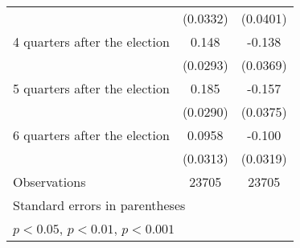 \begin{table}[htbp]
\begin{tabular}{l*{2}{c}}
                    &    (0.0332)         &    (0.0401)         \\
[1em]
 4 quarters after the election&       0.148\sym{***}&      -0.138\sym{***}\\
                    &    (0.0293)         &    (0.0369)         \\
[1em]
 5 quarters after the election&       0.185\sym{***}&      -0.157\sym{***}\\
                    &    (0.0290)         &    (0.0375)         \\
[1em]
 6 quarters after the election&      0.0958\sym{**} &      -0.100\sym{**} \\
                    &    (0.0313)         &    (0.0319)         \\
\hline
Observations        &       23705         &       23705         \\
\hline\hline
\multicolumn{3}{l}{\footnotesize Standard errors in parentheses}\\
\multicolumn{3}{l}{\footnotesize \sym{*} \(p<0.05\), \sym{**} \(p<0.01\), \sym{***} \(p<0.001\)}\\
\end{tabular}
\end{table}
